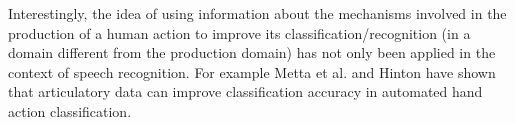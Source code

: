 
Interestingly, the idea of using information about the mechanisms involved in the production of a human action to improve its classification/recognition (in a domain different from the production domain) has not only been applied in the context of speech recognition. For example Metta et al. \cite{metta-06} and Hinton \cite{hinton-2006} 
have shown that articulatory data can improve classification accuracy in automated hand action classification.

